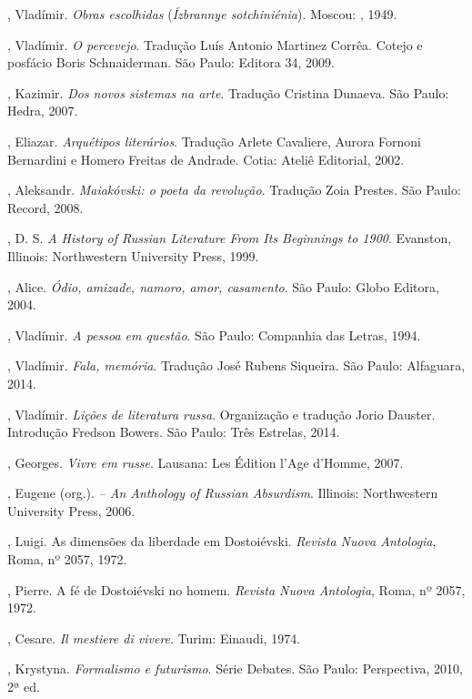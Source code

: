 \begin{Parskip}
{, Vladímir. \emph{Obras escolhidas} (\emph{Ízbrannye sotchiniénia}). Moscou: , 1949.

, Vladímir. \emph{O percevejo}. Tradução Luís Antonio Martinez Corrêa. Cotejo e posfácio Boris Schnaiderman. São Paulo: Editora 34, 2009.

, Kazimir. \emph{Dos novos sistemas na arte}. Tradução Cristina Dunaeva. São Paulo: Hedra, 2007.

, Eliazar. \emph{Arquétipos literários}. Tradução Arlete Cavaliere, Aurora Fornoni Bernardini e Homero Freitas de Andrade. Cotia: Ateliê Editorial, 2002. 

, Aleksandr. \emph{Maiakóvski: o poeta da revolução}. Tradução Zoia Prestes. São Paulo: Record, 2008.

, D. S. \emph{A History of Russian Literature From Its Beginnings
to 1900}. Evanston, Illinois: Northwestern University Press, 1999.

, Alice. \emph{Ódio, amizade, namoro, amor, casamento}. São Paulo: Globo Editora, 2004.

, Vladímir. \emph{A pessoa em questão}. São Paulo: Companhia das Letras, 1994.

, Vladímir. \emph{Fala, memória}. Tradução José Rubens Siqueira. São Paulo: Alfaguara, 2014.

, Vladímir. \emph{Lições de literatura russa}. Organização e tradução Jorio Dauster. Introdução Fredson Bowers. São Paulo: Três Estrelas, 2014.

, Georges. \emph{Vivre em russe}. Lausana: Les Édition l'Age d'Homme, 2007.

, Eugene (org.). \emph{ -- An Anthology of Russian
Absurdism}. Illinois: Northwestern University Press, 2006.

, Luigi. As dimensões da liberdade em Dostoiévski. \emph{Revista Nuova Antologia}, Roma, nº 2057, 1972.

, Pierre. A fé de Dostoiévski no homem. \emph{Revista Nuova Antologia}, Roma, nº 2057, 1972.

, Cesare. \emph{Il mestiere di vivere}. Turim: Einaudi, 1974.

, Krystyna. \emph{Formalismo e futurismo}. Série Debates. São Paulo: Perspectiva, 2010, 2ª ed.

}
\end{Parskip}
